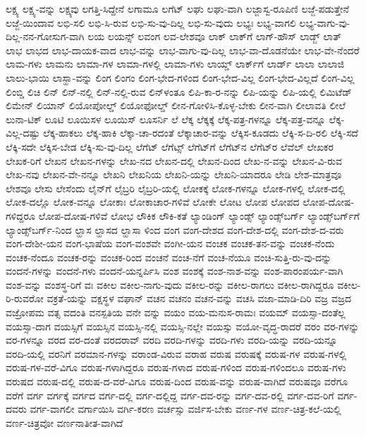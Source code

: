 {ಲಕ್ಷ್ಯ
ಲಕ್ಷ್ಯ-ವನ್ನು
ಲಕ್ಷ್ಯವು
ಲಗತ್ತಿ-ಸಿದ್ದೇನೆ
ಲಗಾಮೂ
ಲಗೆಟ್
ಲಘು
ಲಘು-ವಾಗಿ
ಲಜ್ಜಾಸ್ವ-ರೂಪಿಣಿ
ಲಜ್ಜೆ-ಪಡುತ್ತೇನೆ
ಲಜ್ಜೆ-ಯಿಂದಾವ
ಲಭಿ-ಸಲಿ
ಲಭಿ-ಸಿ-ರುವ
ಲಭಿ-ಸು-ವು-ದಿಲ್ಲ
ಲಭಿ-ಸು-ವುದು
ಲಭ್ಯಃ
ಲಭ್ಯ-ವಾಗಲಿ
ಲಭ್ಯ-ವಾಗು-ವು-ದಿಲ್ಲ-ನನ-ಗೋಸುಗ-ವಾಗಿ
ಲಯ
ಲಯನ್ಸ್
ಲವಂಗ
ಲವ-ಲೇಶವೂ
ಲಾಕ್
ಲಾಕ್‌ಗೆ
ಲಾಗ್‌-ಹೌಸ್
ಲಾಡ್ಜ್
ಲಾತ್
ಲಾಭ
ಲಾಭದ
ಲಾಭ-ದಾಯಕ-ವಾದ
ಲಾಭ-ವನ್ನು
ಲಾಭ-ವಾಗು-ವು-ದಿಲ್ಲ
ಲಾಭ-ವಾ-ದೊಡನೆಯೇ
ಲಾಭ-ವೇ-ನೆಂದರೆ
ಲಾಮ-ಗಳು
ಲಾಮನು
ಲಾಮಾ-ಗಳ
ಲಾಮಾ-ಗಳಲ್ಲಿ
ಲಾಮಾ-ಗಳು
ಲಾಯ್ಡ್‌
ಲಾರ್ಕ್‌ಗೆ
ಲಾರ್ಡ್
ಲಾಲಾ
ಲಾಲಾಜಿ
ಲಾಲು-ಭಾಯಿ
ಲಾಸ್ಹಾ-ವನ್ನು
ಲಿಂಗ
ಲಿಂಗಂ
ಲಿಂಗ-ಭೇದ-ಗಳಿಂದ
ಲಿಂಗ-ಭೇದ-ವಿಲ್ಲ
ಲಿಂಗ-ಭೇದ-ವಿಲ್ಲದೆ
ಲಿಂಗ-ವಿಲ್ಲ
ಲಿಂಬ್ಡಿ
ಲಿಚಿ
ಲಿನ್
ಲಿನ್‌-ನಲ್ಲಿ
ಲಿನ್‌-ನಲ್ಲಿ-ರುವ
ಲಿನ್‌ಳಂತೂ
ಲಿಪಿ-ಕಾ-ರ-ನನ್ನು
ಲಿಪಿ-ಯನ್ನು
ಲಿಪಿ-ಯಲ್ಲಿ
ಲಿಮಿಟೆಡ್
ಲಿಮೇನ್
ಲಿಯಾನ್
ಲಿಯೋಪೋಲ್ಡ್
ಲಿಯೋಫೋಲ್ಡ್
ಲೀನ-ಗೋಳಿಸಿ-ಕೊಳ್ಳ-ಬೇಕು
ಲೀನ-ವಾಗಿ
ಲೀಲಾವತಿ
ಲೀಲೆ
ಲುನಾ-ಟಿಕ್
ಲೂಟಿ
ಲೂಯಿಸಳ
ಲೂಯಿಸ್
ಲೂಸರ್ನಿ
ಲೆ
ಲೆಕ್ಕ
ಲೆಕ್ಕಕ್ಕೆ
ಲೆಕ್ಕ-ಪತ್ರ-ಗಳನ್ನೂ
ಲೆಕ್ಕ-ಪತ್ರ-ವನ್ನೂ
ಲೆಕ್ಕ-ವಿಲ್ಲ-ದಷ್ಟು
ಲೆಕ್ಕ-ಹಾಕಲು
ಲೆಕ್ಕ-ಹಾಕಿ
ಲೆಕ್ಕಾ-ಚಾ-ರದಂತೆ
ಲೆಕ್ಕಾಚಾರ-ವನ್ನು
ಲೆಕ್ಕಿಸ-ಕೂಡದು
ಲೆಕ್ಕಿ-ಸ-ದಿ-ರಲಿ
ಲೆಕ್ಕಿ-ಸದೆ
ಲೆಕ್ಕಿ-ಸದೇ
ಲೆಕ್ಕಿಸ-ಬೇಡ
ಲೆಕ್ಕಿ-ಸು-ವು-ದಿಲ್ಲ
ಲೆಗೆಟ್
ಲೆಗೆಟ್ಸ್
ಲೆಗೆಟ್‌ಗೆ
ಲೆಗೆಟ್‌ನ
ಲೆಗೆಟ್‌ರ
ಲೆವೆಲ್
ಲೇಖಕರ
ಲೇಖಕ-ರಿಗೆ
ಲೇಖನ
ಲೇಖನ-ಗಳನ್ನು
ಲೇಖ-ನದ
ಲೇಖನ-ದಲ್ಲಿ
ಲೇಖನ-ದಿಂದ
ಲೇಖ-ನ-ವನ್ನು
ಲೇಖನ-ವಿ-ರುವ
ಲೇಖ-ನವು
ಲೇಖನ-ವೇ-ನನ್ನೂ
ಲೇಖನಿ
ಲೇಖನಿಯ
ಲೇಖನಿ-ಯನ್ನು
ಲೇಖನಿ-ಯಾದರೂ
ಲೇಡಿ
ಲೇಶ-ಮಾತ್ರವೂ
ಲೇಶವೂ
ಲೇಸು
ಲೇಸೆಂದು
ಲೈನ್‌ಗೆ
ಲೈಬ್ರರಿ
ಲೈಬ್ರರಿ-ಯಲ್ಲಿ
ಲೋಕಕ್ಕೆ
ಲೋಕ-ಗಳನ್ನೂ
ಲೋಕ-ಗಳಲ್ಲಿ
ಲೋಕ-ದಲ್ಲಿ
ಲೋಕ-ದಲ್ಲೊ
ಲೋಕ-ವನ್ನೂ
ಲೋಕಾಃ
ಲೋಕಾಚಾರ-ಗಳಿವೆ
ಲೋಕೇ
ಲೋಟ
ಲೋಪ
ಲೋಪದ
ಲೋಪ-ದೋಷ-ಗಳಿದ್ದರೂ
ಲೋಪ-ದೋಷ-ಗಳಿವೆ
ಲೋಭ
ಲೌಕಿಕ
ಲೌಕಿ-ಕತೆ
ಲ್ಯಾಂಡಿಂಗ್
ಲ್ಯಾಂಡ್ಸ್
ಲ್ಯಾಂಡ್ಸ್‌ಬರ್ಗ್
ಲ್ಯಾಂಡ್ಸ್‌ಬರ್ಗ್‌ಗೆ
ಲ್ಯಾಂಡ್ಸ್‌ಬರ್ಗ್‌-ನಿಂದ
ಲ್ಹಾಸ
ಲ್ಹಾಸದ
ಲ್ಹಾಸಾ
ಳಿಂದ
ವಂಗ
ವಂಗ-ದೇಶದ
ವಂಗ-ದೇಶ-ದಲ್ಲಿ
ವಂಗ-ದೇಶ-ದ-ವರು
ವಂಗ-ದೇಶೀ-ಯನ
ವಂಗ-ಭಾಷೆಯ
ವಂಗ-ವಂಶವೇ
ವಂಗೀ-ಯನ
ವಂಚಕ
ವಂಚಕ-ತನ-ವನ್ನು
ವಂಚಕ-ನೆಂದು
ವಂಚಕ-ನೆಂದೂ
ವಂಚಕ-ರನ್ನು
ವಂಚಕ-ರಿಂದ
ವಂಚನೆ
ವಂಚ-ನೆಗೆ
ವಂಚ-ನೆಯೂ
ವಂಚಿ-ಸುತ್ತಿ-ರು-ವು-ದನ್ನು
ವಂದನೆ-ಗಳನ್ನು
ವಂದನೆ-ಗಳು
ವಂದನೆ-ಯನ್ನರ್ಪಿಸಿ
ವಂಶ
ವಂಶಕ್ಕೆ
ವಂಶ-ನಾಶ-ವನ್ನು
ವಂಶ-ಪಾರಂಪರ್ಯ-ವಾಗಿ
ವಂಶ-ವನ್ನು
ವಂಶಸ್ಥ-ರಿಗೆ
ವಃ
ವಕೀಲ
ವಕೀಲ-ನಾಗು-ವುದು
ವಕೀಲ-ರನ್ನು
ವಕೀಲ-ರಾಗಲು
ವಕೀಲ-ರಾಗಿದ್ದರೂ
ವಕೀಲ-ರಿ-ರುವರೋ
ವಕ್ರತೆ-ಯನ್ನು
ವಕ್ಷಸ್ಥಳ
ವಘಾನ್
ವಚನ
ವಚನಂ
ವಚನ-ವನ್ನು
ವಚಸಿ
ವಜಾ-ಮಾಡಿ-ದಿರಿ
ವಜ್ರ
ವಜ್ರದ
ವಜ್ರೋಪಮ
ವತ್ಸ
ವದಂತಿ
ವನಸ್ಪತಿಯ
ವನೇ
ವನ್ನು
ವಯಂ
ವಯ-ಮನುಸ-ರಾಮಃ
ವಯಮ್
ವಯಸ್ಸಾ-ದಂತೆಲ್ಲ
ವಯಸ್ಸಾ-ದಾಗ
ವಯಸ್ಸಿಗೆ
ವಯಸ್ಸಿನ
ವಯಸ್ಸಿ-ನಲ್ಲಿ
ವಯಸ್ಸಿ-ನಲ್ಲೇ
ವಯಸ್ಸು
ವಯೋ-ವೃದ್ಧ-ರಾದರೆ
ವರಂ
ವರ-ಗಳನ್ನು
ವರ-ಗಳನ್ನೂ
ವರದ
ವರ-ದಂತೆ
ವರದರಾವ್
ವರದಿ
ವರದಿ-ಗಳನ್ನು
ವರದಿ-ಗಳು
ವರದಿ-ಯನ್ನು
ವರದಿ-ಯನ್ನೂ
ವರದಿ-ಯಲ್ಲಿ
ವರನಿಗೆ
ವರಮಾನ-ಗಳನ್ನು
ವರಾಂಡ-ವಿರುವ
ವರಾಹ
ವರುಷ
ವರುಷಕ್ಕೆ
ವರುಷ-ಗಳ
ವರುಷ-ಗಳಲ್ಲಿ
ವರುಷ-ಗಳ-ವರೆ-ವಿಗೂ
ವರುಷ-ಗಳಾಗಿದ್ದರೂ
ವರುಷ-ಗಳಾದ
ವರುಷ-ಗಳಿಂದ
ವರುಷ-ಗಳಿಂದಲೂ
ವರುಷ-ಗಳು
ವರುಷದ
ವರುಷ-ದಲ್ಲಿ
ವರುಷ-ದ-ವರೆ-ವಿಗೂ
ವರುಷ-ದಿಂದ
ವರುಷ-ವನ್ನು
ವರುಷ-ವಾಗಿದೆ
ವರುಷವೂ
ವರೆಗೂ
ವರೆಗೆ
ವರ್ಗ
ವರ್ಗಕ್ಕೆ
ವರ್ಗದ
ವರ್ಗ-ದಲ್ಲಿ
ವರ್ಗ-ದಲ್ಲಿದ್ದ
ವರ್ಗ-ದವ-ರನ್ನು
ವರ್ಗ-ದವ-ರಲ್ಲಿ
ವರ್ಗ-ದವ-ರಿಗೆ
ವರ್ಗ-ದವರು
ವರ್ಗ-ವಾಗಲೀ
ವರ್ಗಾಯಿಸಿ
ವರ್ಗಿ-ಕರಣ
ವರ್ಚಸ್ಸು
ವರ್ಜಿಸ-ಬೇಕು
ವರ್ಣ-ಗಳ
ವರ್ಣ-ಚಿತ್ರ-ಕಲೆ-ಯಲ್ಲಿ
ವರ್ಣ-ಚಿತ್ರವೋ
ವರ್ಣನಾತೀತ-ವಾಗಿದೆ
}
